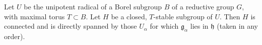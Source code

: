 Let $U$ be the unipotent radical of a Borel subgroup $B$ of a reductive group $G$, with maximal torus $T \subset B$. Let $H$ be a closed, $T$-stable subgroup of $U$. Then $H$ is connected and is directly spanned by those $U_\alpha$ for which $\mathfrak{g}_\alpha$ lies in $\mathfrak{h}$ (taken in any order).
